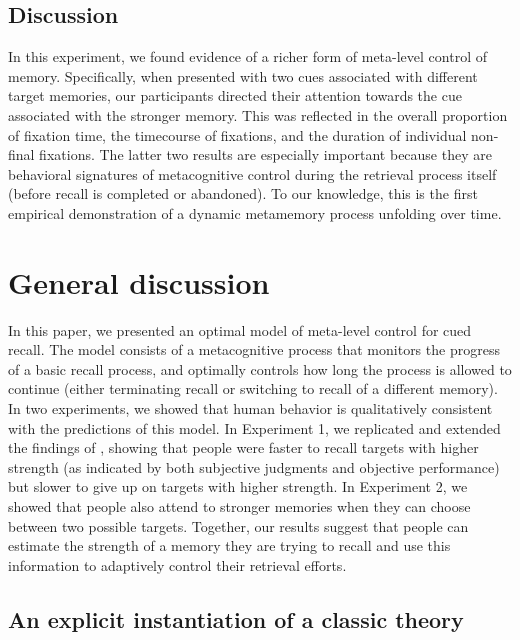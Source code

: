 \subsection{Discussion}

In this experiment, we found evidence of a richer form of meta-level control of memory. Specifically, when presented with two cues associated with different target memories, our participants directed their attention towards the cue associated with the stronger memory. This was reflected in the overall proportion of fixation time, the timecourse of fixations, and the duration of individual non-final fixations. The latter two results are especially important because they are behavioral signatures of metacognitive control during the retrieval process itself (before recall is completed or abandoned). To our knowledge, this is the first empirical demonstration of a dynamic metamemory process unfolding over time. 

\section{General discussion}

In this paper, we presented an optimal model of meta-level control for cued recall. The model consists of a metacognitive process that monitors the progress of a basic recall process, and optimally controls how long the process is allowed to continue (either terminating recall or switching to recall of a different memory). In two experiments, we showed that human behavior is qualitatively consistent with the predictions of this model. In Experiment 1, we replicated and extended the findings of \citet{costermans1992confidence}, showing that people were faster to recall targets with higher strength (as indicated by both subjective judgments and objective performance) but slower to give up on targets with higher strength. In Experiment 2, we showed that people also attend to stronger memories when they can choose between two possible targets. Together, our results suggest that people can estimate the strength of a memory they are trying to recall and use this information to adaptively control their retrieval efforts.

\subsection{An explicit instantiation of a classic theory}

